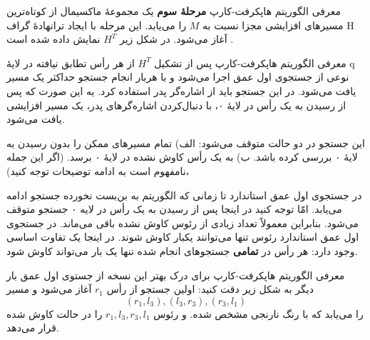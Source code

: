 \begin{itemframe}{‌معرفی الگوریتم هاپکرفت-کارپ}
\itm
\textbf{مرحلهٔ سوم}
یک مجموعهٔ ماکسیمال از کوتاه‌ترین مسیرهای افزایشی مجزا نسبت به $M$ را می‌یابد.
این مرحله با ایجاد ترانهادهٔ گراف H آغاز می‌شود. در شکل زیر $H^T$ نمایش داده شده است .
\end{itemframe}

\begin{itemframe}{‌معرفی الگوریتم هاپکرفت-کارپ}
\decLineSpace[1mm]
\itm
پس از تشکیل  $H^T$ از هر رأس تطابق نیافته در لایهٔ q نوعی از جستجوی اول عمق اجرا می‌شود و با هربار انجام جستجو حداکثر یک مسیر یافت می‌شود.
\itm
در این جستجو باید از اشاره‌گر پدر استفاده کرد. یه این صورت که پس از رسیدن به یک رأس در لایهٔ ۰، با دنبال‌کردن ‌اشاره‌گرهای پدر، یک مسیر افزایشی یافت می‌شود.

\itm
این جستجو در دو حالت متوقف می‌شود:
الف) تمام مسیرهای ممکن را بدون رسیدن به لایهٔ ۰ بررسی کرده باشد.
ب) به یک رأس کاوش نشده در لایهٔ ۰ برسد. (اگر این جمله نامفهوم است به ادامه توضیحات توجه کنید)،

\itm
در جستجوی اول عمق استاندارد تا زمانی که الگوریتم به بن‌بست نخورده جستجو ادامه می‌یابد. امّا توجه کنید در اینجا پس از رسیدن به یک رأس در لایه ۰ جستجو متوقف می‌شود. بنابراین معمولاً تعداد زیادی از رئوس کاوش نشده باقی می‌ماند.
\itm
در جستجوی اول عمق استاندارد رئوس تنها می‌توانند یکبار کاوش شوند. در اینجا یک تفاوت اساسی وجود دارد: هر رأس در \textbf{تمامی} جستجوهای انجام شده تنها یک بار می‌تواند کاوش شود.
\end{itemframe}

\begin{itemframe}{‌معرفی الگوریتم هاپکرفت-کارپ}
\itm
برای درک بهتر این نسخه از جستوی اول عمق بار دیگر به شکل زیر دقت کنید:
\itm
اولین جستجو از رأس
$r_1$
آغاز می‌شود و مسیر
$$ (r_1, l_3), (l_3, r_3), (r_3, l_1) $$
را می‌یابد که با رنگ نارنجی مشخص شده. و رئوس
$r_1, l_3, r_3, l_1$
را در حالت کاوش شده قرار می‌دهد.
\end{itemframe}

